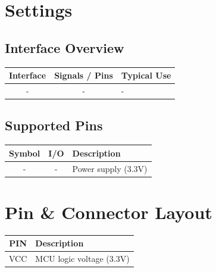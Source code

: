 \documentclass[10pt]{article}
\begin{document}
\vspace{1em}



\section*{Settings}

\subsection*{Interface Overview}
\begin{tabularx}{\textwidth}{|c|c|>{\RaggedRight\arraybackslash}X|}
\hline
\rowcolor{headergray}
Interface & Signals / Pins & Typical Use \\
\hline
- & - & - \\
\hline
\end{tabularx}


\subsection*{Supported Pins}
\begin{tabularx}{\textwidth}{|c|c|>{\RaggedRight\arraybackslash}X|}
\hline
\rowcolor{headergray}
Symbol & I/O & Description \\
\hline
- & - & Power supply (3.3V) \\
\hline
\end{tabularx}




\section*{Pin \& Connector Layout}
\begin{tabularx}{\textwidth}{|c|>{\RaggedRight\arraybackslash}X|}
\hline
\rowcolor{headergray}
PIN & Description \\
\hline
VCC & MCU logic voltage (3.3V) \\
\hline
\end{tabularx}


\FloatBarrier
\newpage
\vspace*{3em}
\end{document}

